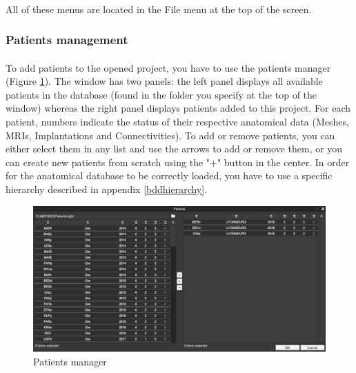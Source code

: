 \documentclass[a4paper]{article}
\begin{document}
\paragraph{} All of these menus are located in the File menu at the top of the screen.
\subsubsection{Patients management}
\paragraph{} To add patients to the opened project, you have to use the patients manager (Figure \ref{patientGestionUI}). The window has two panels: the left panel displays all available patients in the database (found in the folder you specify at the top of the window) whereas the right panel displays patients added to this project. For each patient, numbers indicate the status of their respective anatomical data (Meshes, MRIs, Implantations and Connectivities). To add or remove patients, you can either select them in any list and use the arrows to add or remove them, or you can create new patients from scratch using the "+" button in the center. In order for the anatomical database to be correctly loaded, you have to use a specific hierarchy described in appendix \ref{bddhierarchy}.
\begin{figure}[H]
\begin{center}
\includegraphics[scale=0.3]{PatientGestion.png}
\end{center}
\caption{\label{patientGestionUI}Patients manager}
\end{figure}
\end{document}

